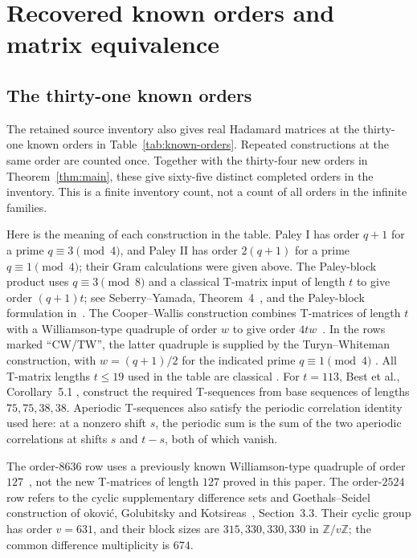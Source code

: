 \documentclass[10pt]{article}
\begin{document}
\section{Recovered known orders and matrix equivalence}\label{sec:known-orders}

\subsection{The thirty-one known orders}

The retained source inventory also gives real Hadamard matrices at the
thirty-one known orders in Table~\ref{tab:known-orders}. Repeated
constructions at the same order are counted once. Together with the
thirty-four new orders in Theorem~\ref{thm:main}, these give sixty-five
distinct completed orders in the inventory. This is a finite inventory
count, not a count of all orders in the infinite families.

Here is the meaning of each construction in the table. Paley I has
order $q+1$ for a prime $q\equiv3\pmod4$, and Paley II has order
$2(q+1)$ for a prime $q\equiv1\pmod4$; their Gram calculations were
given above. The Paley-block product uses $q\equiv3\pmod8$ and a
classical T-matrix input of length $t$ to give order $(q+1)t$;
see Seberry--Yamada, Theorem~4~\cite{seberry-yamada-1990}, and the
Paley-block formulation in~\cite{survey}.
The Cooper--Wallis construction combines T-matrices of length $t$
with a Williamson-type quadruple of order $w$ to give order
$4tw$~\cite{cooperwallis}. In the rows marked ``CW/TW'', the latter
quadruple is supplied by the Turyn--Whiteman construction, with
$w=(q+1)/2$ for the indicated prime $q\equiv1\pmod4$
\cite{turyn1972,whiteman1973}.
All T-matrix lengths $t\leq19$ used in the table are classical
\cite{cooperwallis}. For $t=113$, Best et al., Corollary~5.1
\cite{best2013}, construct the required T-sequences from base sequences
of lengths $75,75,38,38$. Aperiodic T-sequences also satisfy the
periodic correlation identity used here: at a nonzero shift $s$, the
periodic sum is the sum of the two aperiodic correlations at shifts
$s$ and $t-s$, both of which vanish.

The order-$8636$ row uses a previously known Williamson-type quadruple
of order $127$~\cite{djokovic2009}, not the new T-matrices of length
$127$ proved in this paper. The order-$2524$ row refers to the cyclic
supplementary difference sets and Goethals--Seidel construction of
\DJ{}okovi\'c, Golubitsky and Kotsireas~\cite{djk2014}, Section~3.3.
Their cyclic group has order $v=631$, and their block sizes are
$315,330,330,330$ in $\mathbb Z/v\mathbb Z$;
the common difference multiplicity is $674$.
\end{document}
